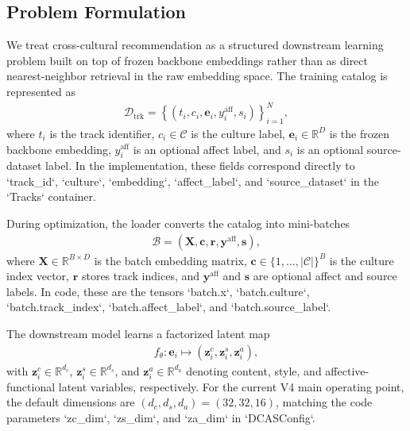 
\subsection{Problem Formulation}

We treat cross-cultural recommendation as a structured downstream learning problem built on top of frozen backbone embeddings rather than as direct nearest-neighbor retrieval in the raw embedding space.
The training catalog is represented as
%
\begin{align}
\mathcal{D}_{\mathrm{trk}}
=
\left\{
\left(
t_i,
c_i,
\mathbf{e}_i,
y_i^{\mathrm{aff}},
s_i
\right)
\right\}_{i=1}^{N},
\end{align}
%
where $t_i$ is the track identifier, $c_i \in \mathcal{C}$ is the culture label, $\mathbf{e}_i \in \mathbb{R}^{D}$ is the frozen backbone embedding, $y_i^{\mathrm{aff}}$ is an optional affect label, and $s_i$ is an optional source-dataset label. In the implementation, these fields correspond directly to `track_id`, `culture`, `embedding`, `affect_label`, and `source_dataset` in the `Tracks` container.

During optimization, the loader converts the catalog into mini-batches
%
\begin{align}
\mathcal{B}
=
\left(
\mathbf{X},
\mathbf{c},
\mathbf{r},
\mathbf{y}^{\mathrm{aff}},
\mathbf{s}
\right),
\end{align}
%
where $\mathbf{X} \in \mathbb{R}^{B \times D}$ is the batch embedding matrix, $\mathbf{c} \in \{1,\dots,|\mathcal{C}|\}^{B}$ is the culture index vector, $\mathbf{r}$ stores track indices, and $\mathbf{y}^{\mathrm{aff}}$ and $\mathbf{s}$ are optional affect and source labels. In code, these are the tensors `batch.x`, `batch.culture`, `batch.track_index`, `batch.affect_label`, and `batch.source_label`.

The downstream model learns a factorized latent map
%
\begin{align}
f_{\theta} : \mathbf{e}_i \mapsto
\left(
\mathbf{z}^{c}_{i},
\mathbf{z}^{s}_{i},
\mathbf{z}^{a}_{i}
\right),
\end{align}
%
with $\mathbf{z}^{c}_{i} \in \mathbb{R}^{d_c}$, $\mathbf{z}^{s}_{i} \in \mathbb{R}^{d_s}$, and $\mathbf{z}^{a}_{i} \in \mathbb{R}^{d_a}$ denoting content, style, and affective-functional latent variables, respectively.
For the current V4 main operating point, the default dimensions are $(d_c,d_s,d_a)=(32,32,16)$, matching the code parameters `zc_dim`, `zs_dim`, and `za_dim` in `DCASConfig`.

